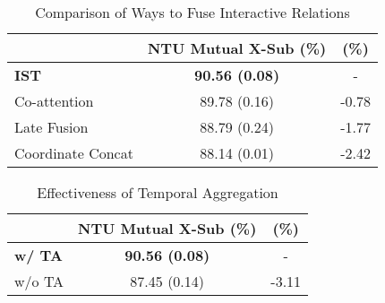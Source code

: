 \documentclass[letterpaper, 10 pt, conference]{ieeeconf}
\begin{document}
\begin{table}[t]
	\centering
	\caption{Comparison of Ways to Fuse Interactive Relations}
	\vspace{-0.7em}
	\label{ablation1}
\begin{tabular}{l|c|c}
            \hline
                & NTU Mutual X-Sub (\%) &  (\%) \\
		\hline
                \textbf{IST} & \textbf{90.56 (0.08)} & - \\
                Co-attention & 89.78 (0.16) & -0.78\\
                Late Fusion & 88.79 (0.24) & -1.77\\
                Coordinate Concat & 88.14 (0.01) & -2.42\\
            \hline
	\end{tabular}
\vspace{-0.8em}
\end{table}

\begin{table}[t]
	\centering
	\caption{Effectiveness of Entity Rearrangements}
	\vspace{-0.7em}
	\label{ablation2}
        \vspace{-1.0em}
\end{table}

\begin{table}[t]
	\centering
	\caption{Effectiveness of Temporal Aggregation}
	\vspace{-0.7em}
	\label{ablation3}
\begin{tabular}{l|c|c}
            \hline
                & NTU Mutual X-Sub (\%) &  (\%)\\
		\hline
                \textbf{w/ TA} & \textbf{90.56 (0.08)} & - \\
                w/o TA & 87.45 (0.14)& -3.11\\
            \hline
	\end{tabular}
\vspace{-0.8em}
\end{table}
\end{document}
